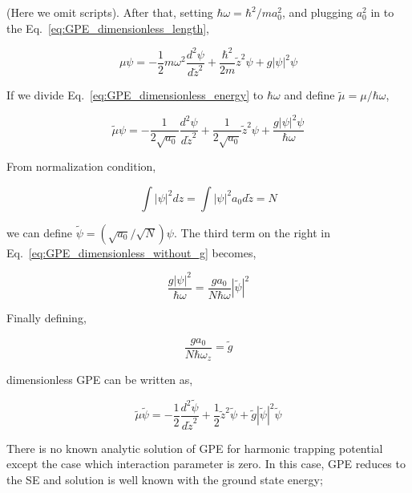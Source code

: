 \documentclass[a4paper,times,12pt]{article}
\begin{document}
\noindent (Here we omit scripts). After that, setting $\hbar\omega = {\hbar^2}/{m a_0^2}$, and plugging $a_0^2$ in to the Eq.~\ref{eq:GPE_dimensionless_length},

\begin{equation}
\label{eq:GPE_dimensionless_energy}
\mu\psi = -\frac{1}{2}m\omega^2\frac{d^2\psi}{d\widetilde{z}^2} + \frac{\hbar^2}{2m}\widetilde{z}^2\psi + g|\psi|^2\psi
\end{equation}

\noindent If we divide Eq.~\ref{eq:GPE_dimensionless_energy} to $\hbar\omega$ and define $\widetilde{\mu} = \mu/\hbar\omega$,

\begin{equation}
\label{eq:GPE_dimensionless_without_g}
\widetilde{\mu} \psi = -\frac{1}{2\sqrt{a_0}}\frac{d^2\psi}{d\widetilde{z}^2} + \frac{1}{2\sqrt{a_0}}\widetilde{z}^2\psi + \frac{g|\psi|^2\psi}{\hbar\omega}
\end{equation}

\noindent From normalization condition,

\begin{equation}
\int |\psi|^2dz = \int |\psi|^2 a_0 d\widetilde{z} = N
\end{equation}

\noindent we can define $\widetilde{\psi} = ({\sqrt{a_0}}/{\sqrt{N}})\psi$. The third term on the right in Eq.~\ref{eq:GPE_dimensionless_without_g} becomes,

\begin{equation}
\label{eq:GPE_dimensionless_g_1}
\frac{g|\psi|^2}{\hbar\omega} = \frac{g a_0}{N\hbar\omega}|\widetilde{\psi}|^2 
\end{equation}

\noindent Finally defining,

\begin{equation}
\label{eq:GPE_dimensionless_g_2}
\frac{g a_0}{N\hbar\omega_z} = \widetilde{g}
\end{equation}

\noindent dimensionless GPE can be written as,

\begin{equation}
\label{eq:GPE_dimensionless}
\widetilde{\mu} \widetilde{\psi} = -\frac{1}{2}\frac{d^2\widetilde{\psi}}{d\widetilde{z}^2} + \frac{1}{2}\widetilde{z}^2\widetilde{\psi} + \widetilde{g}|\widetilde{\psi}|^2 \widetilde{\psi}
\end{equation}

There is no known analytic solution of GPE for harmonic trapping potential except the case which interaction parameter is zero. In this case, GPE reduces to the SE and solution is well known with the ground state energy;
\end{document}

